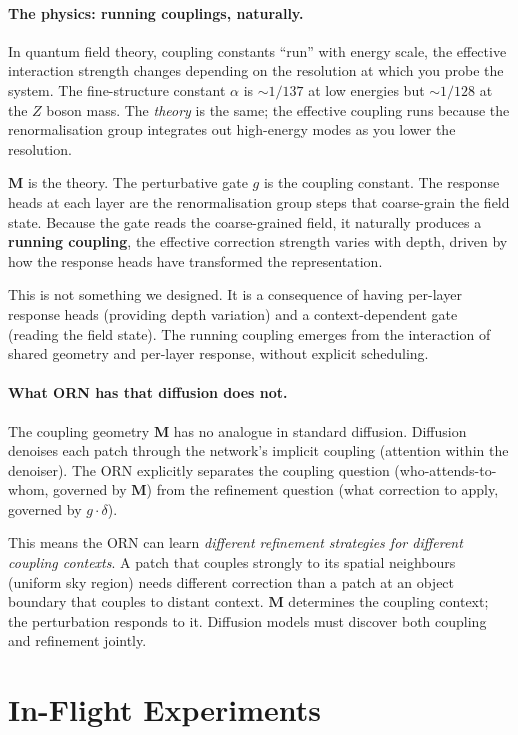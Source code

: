 \documentclass[11pt, a4paper]{article}
\newcommand{\M}{\mathbf{M}}
\theoremstyle{plain}
\theoremstyle{remark}
\begin{document}
\paragraph{The physics: running couplings, naturally.}
In quantum field theory, coupling constants ``run'' with energy scale, the effective interaction strength changes depending on the resolution at which you probe the system.
The fine-structure constant $\alpha$ is ${\sim}1/137$ at low energies but ${\sim}1/128$ at the $Z$ boson mass.
The \emph{theory} is the same; the effective coupling runs because the renormalisation group integrates out high-energy modes as you lower the resolution.

$\M$ is the theory.
The perturbative gate $g$ is the coupling constant.
The response heads at each layer are the renormalisation group steps that coarse-grain the field state.
Because the gate reads the coarse-grained field, it naturally produces a \textbf{running coupling}, the effective correction strength varies with depth, driven by how the response heads have transformed the representation.

This is not something we designed.
It is a consequence of having per-layer response heads (providing depth variation) and a context-dependent gate (reading the field state).
The running coupling emerges from the interaction of shared geometry and per-layer response, without explicit scheduling.

\paragraph{What ORN has that diffusion does not.}
The coupling geometry $\M$ has no analogue in standard diffusion.
Diffusion denoises each patch through the network's implicit coupling (attention within the denoiser).
The ORN explicitly separates the coupling question (who-attends-to-whom, governed by $\M$) from the refinement question (what correction to apply, governed by $g \cdot \delta$).

This means the ORN can learn \emph{different refinement strategies for different coupling contexts}.
A patch that couples strongly to its spatial neighbours (uniform sky region) needs different correction than a patch at an object boundary that couples to distant context.
$\M$ determines the coupling context; the perturbation responds to it.
Diffusion models must discover both coupling and refinement jointly.

\section{In-Flight Experiments}
\end{document}
